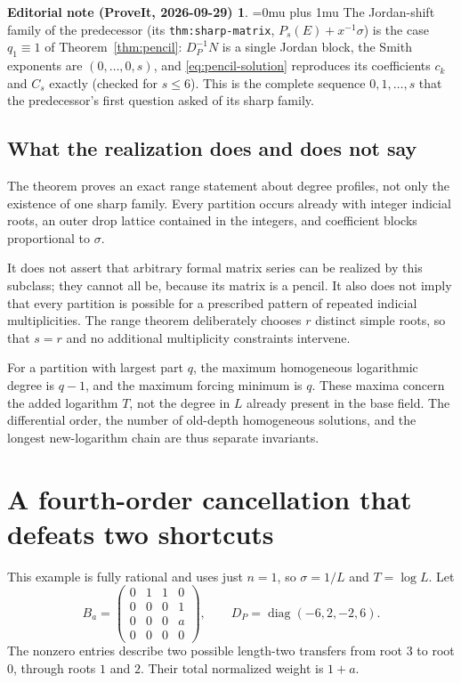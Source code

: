 \documentclass[11pt,a4paper]{article}
\numberwithin{equation}{section}
\theoremstyle{definition}
\theoremstyle{remark}
\theoremstyle{definition}
\newtheorem*{ednoteinner}{Editorial note (ProveIt, 2026-09-29)}
\newenvironment{ednote}{\begin{ednoteinner}\sloppy\Urlmuskip=0mu plus 1mu\relax}{\end{ednoteinner}}
\newcommand{\diag}{\operatorname{diag}}
\begin{document}
\begin{ednote}
The Jordan-shift family of the predecessor (its \texttt{thm:sharp-matrix}, $P_s(E)+x^{-1}\sigma$) \cite{repo-residue} is the case $q_1\equiv1$ of Theorem~\ref{thm:pencil}: $D_P^{-1}N$ is a single Jordan block, the Smith exponents are $(0,\ldots,0,s)$, and \eqref{eq:pencil-solution} reproduces its coefficients $c_k$ and $C_s$ exactly (checked for $s\le6$). This is the complete sequence $0,1,\ldots,s$ that the predecessor's first question asked of its sharp family.
\end{ednote}

\subsection{What the realization does and does not say}
The theorem proves an exact range statement about degree profiles, not only the existence of one sharp family. Every partition occurs already with integer indicial roots, an outer drop lattice contained in the integers, and coefficient blocks proportional to $\sigma$.

It does not assert that arbitrary formal matrix series can be realized by this subclass; they cannot all be, because its matrix is a pencil. It also does not imply that every partition is possible for a prescribed pattern of repeated indicial multiplicities. The range theorem deliberately chooses $r$ distinct simple roots, so that $s=r$ and no additional multiplicity constraints intervene.

For a partition with largest part $q$, the maximum homogeneous logarithmic degree is $q-1$, and the maximum forcing minimum is $q$. These maxima concern the added logarithm $T$, not the degree in $L$ already present in the base field. The differential order, the number of old-depth homogeneous solutions, and the longest new-logarithm chain are thus separate invariants.

\section{A fourth-order cancellation that defeats two shortcuts}
\label{sec:diamond}
This example is fully rational and uses just $n=1$, so $\sigma=1/L$ and $T=\log L$. Let
\begin{equation}
 B_a=
 \begin{pmatrix}
 0&1&1&0\\
 0&0&0&1\\
 0&0&0&a\\
 0&0&0&0
 \end{pmatrix},
 \qquad
 D_P=\diag(-6,2,-2,6).
 \label{eq:diamond-B}
\end{equation}
The nonzero entries describe two possible length-two transfers from root $3$ to root $0$, through roots $1$ and $2$. Their total normalized weight is $1+a$.
\end{document}
